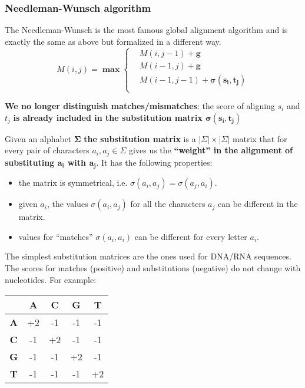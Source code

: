 \documentclass[../main.tex]{subfiles}
\begin{document}
\subsubsection{Needleman-Wunsch algorithm}

The Needleman-Wunsch is the most famous global alignment algorithm and is  exactly the same as above but formalized in a different way.
$$
	M(i, j) = \bm{\max} \left\{\begin{array}{rcl}
		 & M(i, j-1) + \mathbf{g}                       \\
		 & M(i-1, j) + \mathbf{g}                       \\
		 & M(i-1, j-1) + \mathbf{\bm{\sigma}(s_i, t_j)} \\
	\end{array}
	\right.
$$

\textbf{We no longer distinguish matches/mismatches}: the score of aligning $s_i$ and $t_j$ \textbf{is already included in the substitution matrix $\bm{\sigma(s_i, t_j)}$}

Given an alphabet $\bm{\Sigma}$\textbf{ the substitution matrix} is a $|\Sigma|\times|\Sigma|$ matrix that for every pair of characters $a_i, a_j \in \Sigma$ gives us the \textbf{``weight'' in the alignment of substituting $\mathbf{a_i}$ with $\mathbf{a_j}$}. It has the following properties:
\begin{itemize}
	\item the matrix is symmetrical, i.e. $\sigma(a_i, a_j) = \sigma(a_j, a_i)$.
	\item given $a_i$, the values $\sigma(a_i, a_j)$ for all the characters $a_j$ can be different in the matrix.
	\item values for ``matches'' $\sigma(a_i, a_i)$ can be different for every letter $a_i$.
\end{itemize}

The simplest substitution matrices are the ones used for DNA/RNA sequences. The scores for matches (positive) and substitutions (negative) do not change with nucleotides. For example:

\begin{center}
	\begin{tabular}{|c|c|c|c|c|}
		\hline
		           & \textbf{A} & \textbf{C} & \textbf{G} & \textbf{T} \\
		\hline
		\textbf{A} & +2         & -1         & -1         & -1         \\
		\hline
		\textbf{C} & -1         & +2         & -1         & -1         \\
		\hline
		\textbf{G} & -1         & -1         & +2         & -1         \\
		\hline
		\textbf{T} & -1         & -1         & -1         & +2         \\
		\hline
	\end{tabular}
\end{center}
\end{document}
